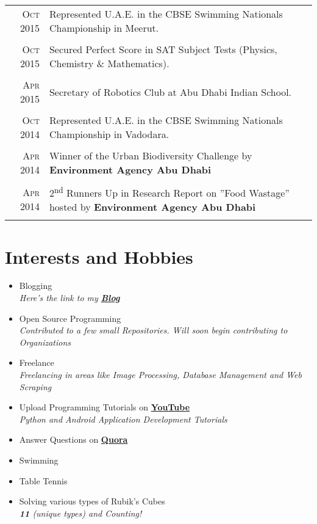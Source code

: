 \documentclass[a4paper,10pt]{article}
\begin{document}
\begin{tabular}{r|p{13.7cm}}
\textsc{Oct} 2015 & Represented U.A.E. in the CBSE Swimming Nationals Championship in Meerut.\\\multicolumn{2}{c}{}\\
\textsc{Oct} 2015 & Secured Perfect Score in SAT Subject Tests (Physics, Chemistry \& Mathematics).\\\multicolumn{2}{c}{}\\
\textsc{Apr} 2015 & Secretary of Robotics Club at Abu Dhabi Indian School. \\\multicolumn{2}{c}{}\\
\textsc{Oct} 2014 & Represented U.A.E. in the CBSE Swimming Nationals Championship in Vadodara.  \\\multicolumn{2}{c}{}\\
\textsc{Apr} 2014 & Winner of the Urban Biodiversity Challenge by \textbf{Environment Agency Abu Dhabi} \\\multicolumn{2}{c}{}\\
\textsc{Apr} 2014 & 2\textsuperscript{nd} Runners Up in Research Report on ''Food Wastage'' hosted by \textbf{Environment Agency Abu Dhabi} \\\multicolumn{2}{c}{}\\
\end{tabular}




\section{Interests and Hobbies}
\begin{itemize}
  \item Blogging \\
  \emph{\small{Here's the link to my \href{https://medium.com/@yashitmaheshwary}{\textbf{Blog}}}}
  \item Open Source Programming \\
  \emph{\small{Contributed to a few small Repositories. Will soon begin contributing to Organizations}}
  \item Freelance \\
  \emph{\small{Freelancing in areas like Image Processing, Database Management and Web Scraping}}
  \item Upload Programming Tutorials on \href{https://www.youtube.com/channel/UC5A8roRFNDmhw4jNKiQqWnQ}{\textbf{YouTube}} \\
  \emph{\small{Python and Android Application Development Tutorials}}
  \item Answer Questions on \href{https://www.quora.com/profile/Yashit-Maheshwary}{\textbf{Quora}}
  \item Swimming
  \item Table Tennis
  \item Solving various types of Rubik's Cubes \\
  \emph{\normalsize{\textbf{11}} \small{(unique types) and Counting!}}
\end{itemize}
\end{document}
